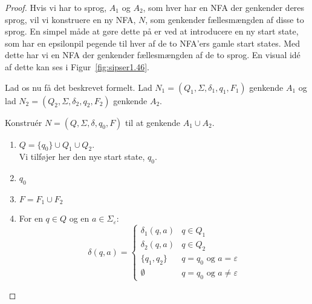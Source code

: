\begin{proof}
	Hvis vi har to sprog, $A_{1}$ og $A_{2}$, som hver har en NFA der genkender deres sprog, vil vi konstruere en ny NFA, $N$, som genkender fællesmængden af disse to sprog. En simpel måde at gøre dette på er ved at introducere en ny start state, som har en epsilonpil pegende til hver af de to NFA'ers gamle start states. Med dette har vi en NFA der genkender fællesmængden af de to sprog. En visual idé af dette kan ses i Figur~\ref{fig:sipser1.46}.


	Lad os nu få det beskrevet formelt. Lad $N_{1} = (Q_{1}, \Sigma, \delta_{1}, q_{1}, F_{1})$ genkende $A_{1}$ og lad $N_{2} = (Q_{2}, \Sigma, \delta_{2}, q_{2}, F_{2})$ genkende $A_{2}$.

	Konstruér $N = (Q, \Sigma, \delta, q_{0}, F)$ til at genkende $A_1 \cup A_{2}$.
	\begin{enumerate}
		\item $Q = \{q_{0}\} \cup Q_{1} \cup Q_{2}$.\\ Vi tilføjer her den nye start state, $q_{0}$.
		\item $q_{0}$
		\item $F = F_{1} \cup F_{2}$
		\item For en $q \in Q$ og en $a \in \Sigma_{\varepsilon}$:
		      \begin{equation*}
			      \delta(q,a) = \begin{cases}
				      \delta_{1}(q,a)  & q \in Q_{1}                              \\
				      \delta_{2}(q,a)  & q \in Q_{2}                              \\
				      \{q_{1}, q_{2}\} & q = q_{0} \text{ og } a = \varepsilon    \\
				      \emptyset        & q = q_{0} \text{ og } a \neq \varepsilon
			      \end{cases}
		      \end{equation*}
	\end{enumerate}

\end{proof}

